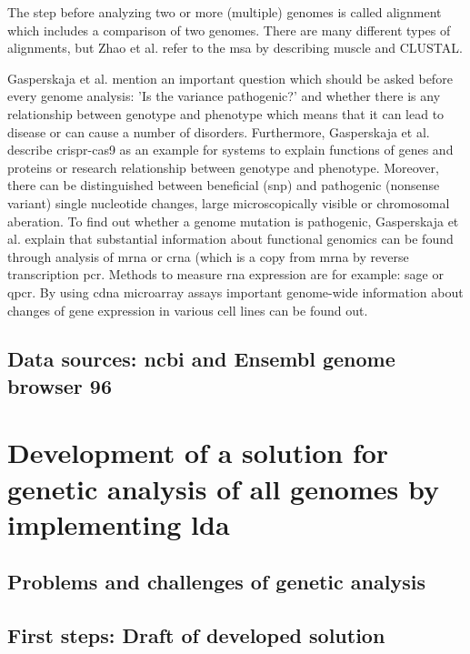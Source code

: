 The step before analyzing two or more (multiple) genomes is called alignment which includes a comparison of two genomes. There are many different types of alignments, but Zhao et al. refer to the \gls{msa} by describing \gls{muscle} and CLUSTAL.

Gasperskaja et al. \autocite{gasperskaja_2017} mention an important question which should be asked before every genome analysis: 'Is the variance pathogenic?' and whether there is any relationship between genotype and phenotype which means that it can lead to disease or can cause a number of disorders. 
Furthermore, Gasperskaja et al. \autocite{gasperskaja_2017} describe \gls{crispr-cas9} as an example for systems to explain functions of genes and proteins or research relationship between genotype and phenotype. Moreover, there can be distinguished between beneficial (\gls{snp}) and pathogenic (nonsense variant) single nucleotide changes, large microscopically visible or chromosomal aberation. 
To find out whether a genome mutation is pathogenic, Gasperskaja et al. \autocite{gasperskaja_2017} explain that substantial information about functional genomics can be found through analysis of \gls{mrna} or \gls{crna} (which is a copy from \gls{mrna} by reverse transcription \gls{pcr}.
Methods to measure \gls{rna} expression are for example: \gls{sage} or \gls{qpcr}.
By using \gls{cdna} microarray assays important genome-wide information about changes of gene expression in various cell lines can be found out.


\section{Data sources: \gls{ncbi} and Ensembl genome browser 96}\label{datasources}

\chapter{Development of a solution for genetic analysis of \gls{all} genomes by implementing \gls{lda}}\label{development}
\section{Problems and challenges of genetic analysis}\label{problems_challenges}
\section{First steps: Draft of developed solution}\label{draft}

